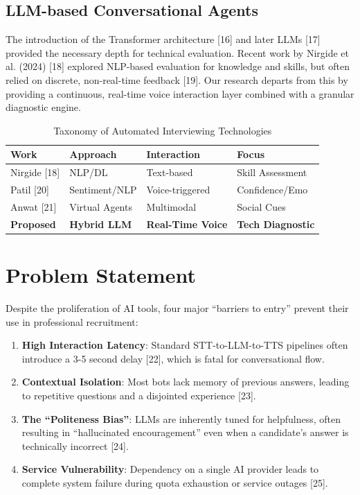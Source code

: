 \documentclass[conference]{IEEEtran}
\begin{document}
\subsection{LLM-based Conversational Agents}
The introduction of the Transformer architecture [16] and later LLMs [17] provided the necessary depth for technical evaluation. Recent work by Nirgide et al. (2024) [18] explored NLP-based evaluation for knowledge and skills, but often relied on discrete, non-real-time feedback [19]. Our research departs from this by providing a continuous, real-time voice interaction layer combined with a granular diagnostic engine.

\begin{table}[h]
\centering
\caption{Taxonomy of Automated Interviewing Technologies}
\begin{tabular}{@{}llll@{}}
\toprule
\textbf{Work} & \textbf{Approach} & \textbf{Interaction} & \textbf{Focus} \\ \midrule
Nirgide [18] & NLP/DL & Text-based & Skill Assessment \\
Patil [20] & Sentiment/NLP & Voice-triggered & Confidence/Emo \\
Anwat [21] & Virtual Agents & Multimodal & Social Cues \\
\textbf{Proposed} & \textbf{Hybrid LLM} & \textbf{Real-Time Voice} & \textbf{Tech Diagnostic} \\ \bottomrule
\end{tabular}
\end{table}

\section{Problem Statement}

Despite the proliferation of AI tools, four major ``barriers to entry'' prevent their use in professional recruitment:
\begin{enumerate}
    \item \textbf{High Interaction Latency}: Standard STT-to-LLM-to-TTS pipelines often introduce a 3-5 second delay [22], which is fatal for conversational flow.
    \item \textbf{Contextual Isolation}: Most bots lack memory of previous answers, leading to repetitive questions and a disjointed experience [23].
    \item \textbf{The ``Politeness Bias''}: LLMs are inherently tuned for helpfulness, often resulting in ``hallucinated encouragement'' even when a candidate's answer is technically incorrect [24].
    \item \textbf{Service Vulnerability}: Dependency on a single AI provider leads to complete system failure during quota exhaustion or service outages [25].
\end{enumerate}
\end{document}
